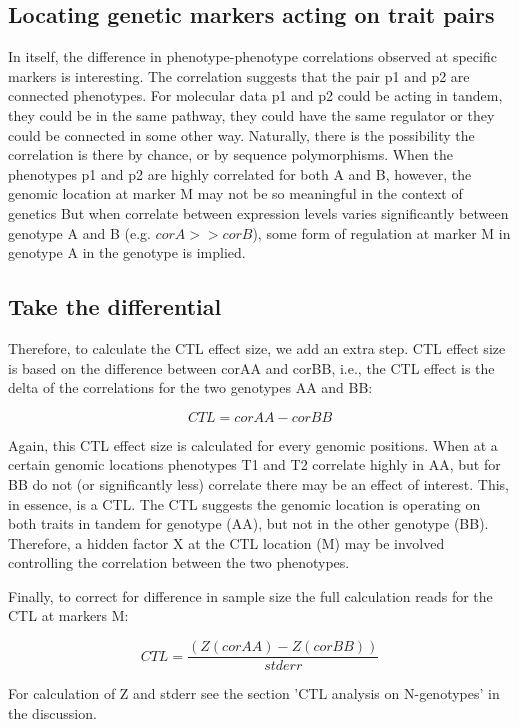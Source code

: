   \subsection{Locating genetic markers acting on trait pairs}
  In itself, the difference in phenotype-phenotype correlations observed at specific markers is interesting. The correlation 
  suggests that the pair p1 and p2 are connected phenotypes. For molecular data p1 and p2 could be acting in tandem, they could 
  be in the same pathway, they could have the same regulator or they could be connected in some other way.
  Naturally, there is the possibility the correlation is there by chance, or by sequence polymorphisms\cite{Alberts:2007}.
  When the phenotypes p1 and p2 are highly correlated for both A and B, however, the genomic location at marker M may not be so
  meaningful in the context of genetics  But when correlate between expression levels varies significantly between genotype A 
  and B (e.g. $corA >> corB$), some form of regulation at marker M in genotype A in the genotype is implied.

  \subsection{Take the differential}
  Therefore, to calculate the CTL effect size, we add an extra step. CTL effect size is based on the difference between corAA and 
  corBB, i.e., the CTL effect is the delta of the correlations for the two genotypes AA and BB:

  $$ CTL = corAA - corBB $$

  Again, this CTL effect size is calculated for every genomic positions.  When at a certain genomic locations phenotypes T1 and T2 
  correlate highly in AA, but for BB do not (or significantly less) correlate there may be an effect of interest. This, in essence, 
  is a CTL. The CTL suggests the genomic location is operating on both traits in tandem for genotype (AA), but not in the other 
  genotype (BB). Therefore, a hidden factor X at the CTL location (M) may be involved controlling the correlation between the two 
  phenotypes.

  Finally, to correct for difference in sample size the full calculation reads for the CTL at markers M:
  
  $$  CTL = \frac{(Z(corAA) - Z(corBB))}{stderr} $$

  For calculation of Z and stderr see the section 'CTL analysis on N-genotypes' in the discussion.

